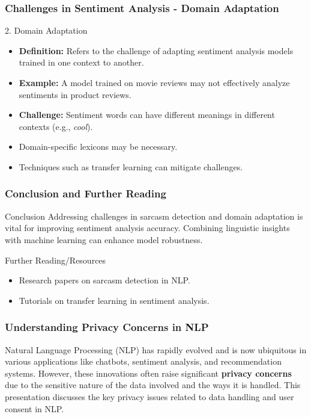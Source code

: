 \documentclass[aspectratio=169]{beamer}
\begin{document}
\begin{frame}[fragile]
    \frametitle{Challenges in Sentiment Analysis - Domain Adaptation}
    \begin{block}{2. Domain Adaptation}
        \begin{itemize}
            \item \textbf{Definition:} Refers to the challenge of adapting sentiment analysis models trained in one context to another.
            \item \textbf{Example:} A model trained on movie reviews may not effectively analyze sentiments in product reviews.
            \item \textbf{Challenge:} Sentiment words can have different meanings in different contexts (e.g., \textit{cool}).
        \end{itemize}
    \end{block}
    \begin{itemize}
        \item Domain-specific lexicons may be necessary.
        \item Techniques such as transfer learning can mitigate challenges.
    \end{itemize}
\end{frame}

\begin{frame}[fragile]
    \frametitle{Conclusion and Further Reading}
    \begin{block}{Conclusion}
        Addressing challenges in sarcasm detection and domain adaptation is vital for improving sentiment analysis accuracy. Combining linguistic insights with machine learning can enhance model robustness.
    \end{block}
    \begin{block}{Further Reading/Resources}
        \begin{itemize}
            \item Research papers on sarcasm detection in NLP.
            \item Tutorials on transfer learning in sentiment analysis.
        \end{itemize}
    \end{block}
\end{frame}

\begin{frame}[fragile]
    \frametitle{Understanding Privacy Concerns in NLP}
    Natural Language Processing (NLP) has rapidly evolved and is now ubiquitous in various applications like chatbots, sentiment analysis, and recommendation systems. 
    However, these innovations often raise significant \textbf{privacy concerns} due to the sensitive nature of the data involved and the ways it is handled. 
    This presentation discusses the key privacy issues related to data handling and user consent in NLP.
\end{frame}
\end{document}
